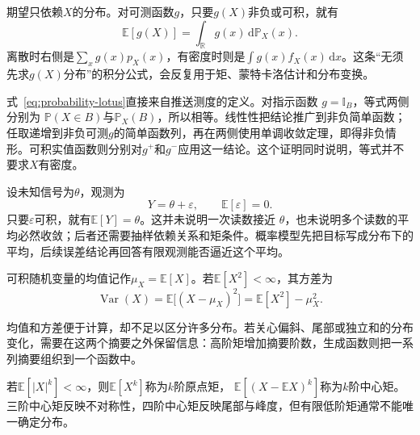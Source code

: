 期望只依赖\(X\)的分布。对可测函数\(g\)，只要\(g(X)\)非负或可积，就有
\begin{equation}
  \mathbb{E}[g(X)]
  =
  \int_{\mathbb{R}}g(x)\,\mathrm{d}\mathbb{P}_X(x).
  \label{eq:probability-lotus}
\end{equation}
离散时右侧是\(\sum_x g(x)p_X(x)\)，有密度时则是\(\int g(x)f_X(x)\,\mathrm{d}x\)。这条“无须先求\(g(X)\)分布”的积分公式，会反复用于矩、蒙特卡洛估计和分布变换。

式~\eqref{eq:probability-lotus}直接来自推送测度的定义。对指示函数
\(g=\mathbb{I}_B\)，等式两侧分别为
\(\mathbb{P}(X\in B)\)与\(\mathbb{P}_X(B)\)，所以相等。线性性把结论推广到非负简单函数；任取递增到非负可测\(g\)的简单函数列，再在两侧使用单调收敛定理，即得非负情形。可积实值函数则分别对\(g^+\)和\(g^-\)应用这一结论。这个证明同时说明，等式并不要求\(X\)有密度。

\begin{example}[带噪观测的平均目标]
\label{ex:probability-noisy-observation}
设未知信号为\(\theta\)，观测为
\[ Y=\theta+\varepsilon,
  \qquad\mathbb{E}[\varepsilon]=0. \]
只要\(\varepsilon\)可积，就有\(\mathbb{E}[Y]=\theta\)。这并未说明一次读数接近
\(\theta\)，也未说明多个读数的平均必然收敛；后者还需要抽样依赖关系和矩条件。概率模型先把目标写成分布下的平均，后续误差结论再回答有限观测能否逼近这个平均。
\end{example}
可积随机变量的均值记作\(\mu_X=\mathbb{E}[X]\)。若\(\mathbb{E}[X^2]<\infty\)，其方差为
\[ \operatorname{Var}(X)
  =\mathbb{E}\bigl[(X-\mu_X)^2\bigr]=\mathbb{E}[X^2]-\mu_X^2. \]

均值和方差便于计算，却不足以区分许多分布。若关心偏斜、尾部或独立和的分布变化，需要在这两个摘要之外保留信息：高阶矩增加摘要阶数，生成函数则把一系列摘要组织到一个函数中。

若\(\mathbb{E}[|X|^k]<\infty\)，则\(\mathbb{E}[X^k]\)称为\(k\)阶原点矩，
\(\mathbb{E}[(X-\mathbb{E}X)^k]\)称为\(k\)阶中心矩。三阶中心矩反映不对称性，四阶中心矩反映尾部与峰度，但有限低阶矩通常不能唯一确定分布。


